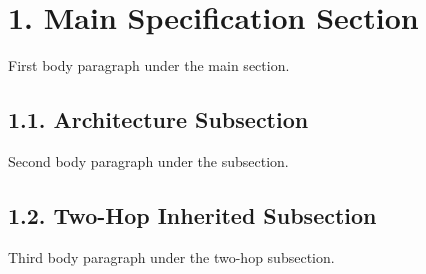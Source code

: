 \documentclass[11pt,a4paper]{article}
\begin{document}
\section{1. Main Specification Section}

First body paragraph under the main section.

\subsection{1.1. Architecture Subsection}

Second body paragraph under the subsection.

\subsection{1.2. Two-Hop Inherited Subsection}

Third body paragraph under the two-hop subsection.
\end{document}
